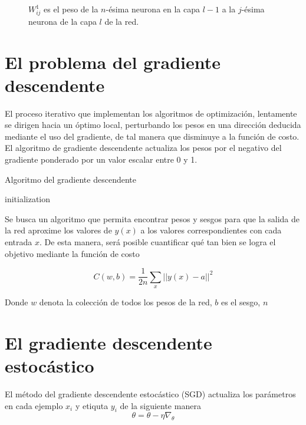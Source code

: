\begin{figure}[H]
	\centering
    \scalebox{0.6}{}
    \caption{$W^{1}_{ij}$ es el peso de la $n$-ésima neurona en la capa $l - 1$ a la $j$-ésima neurona de la capa $l$ de la red.}
\end{figure}

\section{El problema del gradiente descendente}
El proceso iterativo que implementan los algoritmos de optimización, lentamente se dirigen hacia un óptimo local, perturbando los pesos en una dirección deducida mediante el uso del gradiente, de tal manera que disminuye a la función de costo. El algoritmo de gradiente descendente actualiza los pesos por el negativo del gradiente ponderado por un valor escalar entre 0 y 1.

\begin{algorithm}[H]
	\SetAlgoLined
	\caption{Algoritmo del gradiente descendente}
	initialization\;
\end{algorithm}

\newpage
Se busca un algoritmo que permita encontrar pesos y sesgos para que la salida de la red aproxime los valores de $y(x)$ a los valores correspondientes con cada entrada $x$. De esta manera, será posible cuantificar qué tan bien se logra el objetivo mediante la función de costo

$$C(w, b) = \frac{1}{2n}\sum_{x} ||y(x) - a||^2$$

Donde $w$ denota la colección de todos los pesos de la red, $b$ es el sesgo, $n$



\section{El gradiente descendente estocástico}
El método del gradiente descendente estocástico (SGD) actualiza los parámetros en cada ejemplo $x_i$ y etiquta $y_i$ de la siguiente manera $$ \theta = \theta - \eta\nabla_\theta $$
